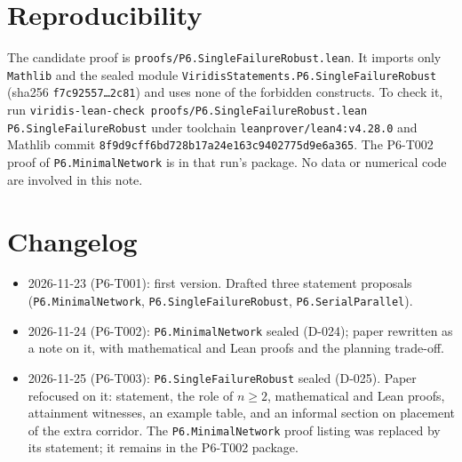 \documentclass[11pt]{article}
\begin{document}
\section{Reproducibility}
The candidate proof is \texttt{proofs/P6.SingleFailureRobust.lean}. It imports only \texttt{Mathlib} and the
sealed module \texttt{ViridisStatements.P6.SingleFailureRobust} (sha256 \texttt{f7c92557\ldots 2c81}) and uses
none of the forbidden constructs. To check it, run
\texttt{viridis-lean-check proofs/P6.SingleFailureRobust.lean P6.SingleFailureRobust} under toolchain
\texttt{leanprover/lean4:v4.28.0} and Mathlib commit \texttt{8f9d9cff6bd728b17a24e163c9402775d9e6a365}.
The P6-T002 proof of \texttt{P6.MinimalNetwork} is in that run's package. No data or numerical code are
involved in this note.

\section*{Changelog}
\begin{itemize}
\item 2026-11-23 (P6-T001): first version. Drafted three statement proposals
(\texttt{P6.MinimalNetwork}, \texttt{P6.SingleFailureRobust}, \texttt{P6.SerialParallel}).
\item 2026-11-24 (P6-T002): \texttt{P6.MinimalNetwork} sealed (D-024); paper rewritten as a note on it,
with mathematical and Lean proofs and the planning trade-off.
\item 2026-11-25 (P6-T003): \texttt{P6.SingleFailureRobust} sealed (D-025). Paper refocused on it: statement,
the role of $n\ge 2$, mathematical and Lean proofs, attainment witnesses, an example table, and an informal
section on placement of the extra corridor. The \texttt{P6.MinimalNetwork} proof listing was replaced by its
statement; it remains in the P6-T002 package.
\end{itemize}



\end{document}

